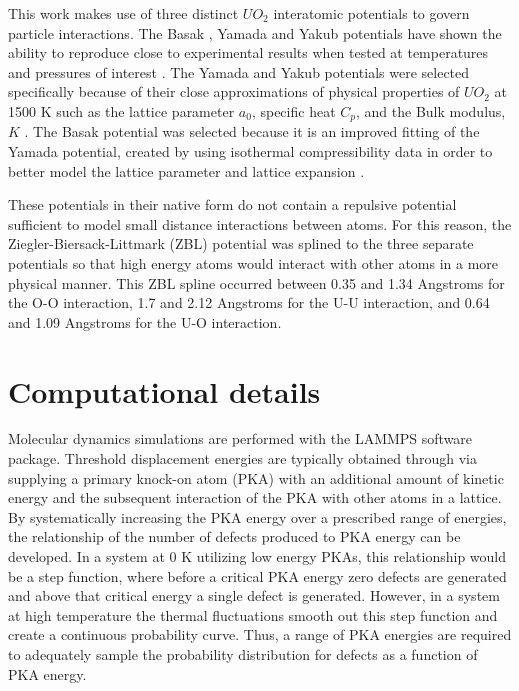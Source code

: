 \documentclass[8pt]{article}   	%
\begin{document}
This work makes use of three distinct $UO_2$ interatomic potentials to govern particle interactions. The Basak \cite{basak}, Yamada\cite{yamada} and Yakub \cite{yakub} potentials have shown the ability to reproduce close to experimental results when tested at temperatures and pressures of interest \cite{govers1,govers2,potashnikov}. The Yamada and Yakub potentials were selected specifically because of their close approximations of physical properties of $UO_2$ at 1500 K such as the lattice parameter $a_0$, specific heat $C_p$, and the Bulk modulus, $K$ \cite{govers2}. The Basak potential was selected because it is an improved fitting of the Yamada potential, created by using isothermal compressibility data in order to better model the lattice parameter and lattice expansion \cite{basak}. 

These potentials in their native form do not contain a repulsive potential sufficient to model small distance interactions between atoms. For this reason, the Ziegler-Biersack-Littmark (ZBL) \cite{ZBL} potential was splined to the three separate potentials so that high energy atoms would interact with other atoms in a more physical manner. This ZBL spline occurred between 0.35 and 1.34 Angstroms for the O-O interaction, 1.7 and 2.12 Angstroms for the U-U interaction, and 0.64 and 1.09 Angstroms for the U-O interaction.

\section{Computational details}

\hspace{5mm}

Molecular dynamics simulations are performed with the LAMMPS \cite{lammps} software package. Threshold displacement energies are typically obtained through via supplying a primary knock-on atom (PKA) with an additional amount of kinetic energy and the subsequent interaction of the PKA with other atoms in a lattice. By systematically increasing the PKA energy over a prescribed range of energies, the relationship of the number of defects produced to PKA energy can be developed. In a system at 0 K utilizing low energy PKAs, this relationship would be a step function, where before a critical PKA energy zero defects are generated and above that critical energy a single defect is generated. However, in a system at high temperature the thermal fluctuations smooth out this step function and create a continuous probability curve. Thus, a range of PKA energies are required to adequately sample the probability distribution for defects as a function of PKA energy. 
\end{document}
